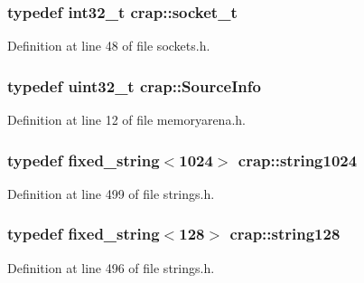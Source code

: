 \hypertarget{namespacecrap_af06d7d92e9405fc0750f74417541c2be}{}
\subsubsection[{socket\+\_\+t}]{\setlength{\rightskip}{0pt plus 5cm}typedef int32\+\_\+t {\bf crap\+::socket\+\_\+t}}\label{namespacecrap_af06d7d92e9405fc0750f74417541c2be}


Definition at line 48 of file sockets.\+h.

\hypertarget{namespacecrap_acad6ca15596aab071175697e764086bb}{}
\subsubsection[{Source\+Info}]{\setlength{\rightskip}{0pt plus 5cm}typedef uint32\+\_\+t {\bf crap\+::\+Source\+Info}}\label{namespacecrap_acad6ca15596aab071175697e764086bb}


Definition at line 12 of file memoryarena.\+h.

\hypertarget{namespacecrap_acbceaa050a351b36f8b29129f49621c1}{}
\subsubsection[{string1024}]{\setlength{\rightskip}{0pt plus 5cm}typedef {\bf fixed\+\_\+string}$<$1024$>$ {\bf crap\+::string1024}}\label{namespacecrap_acbceaa050a351b36f8b29129f49621c1}


Definition at line 499 of file strings.\+h.

\hypertarget{namespacecrap_a6d163720fa009acb153550f4486ff6da}{}
\subsubsection[{string128}]{\setlength{\rightskip}{0pt plus 5cm}typedef {\bf fixed\+\_\+string}$<$128$>$ {\bf crap\+::string128}}\label{namespacecrap_a6d163720fa009acb153550f4486ff6da}


Definition at line 496 of file strings.\+h.

\hypertarget{namespacecrap_a6cff91a13d8be23072b3a0754c947caa}{}
